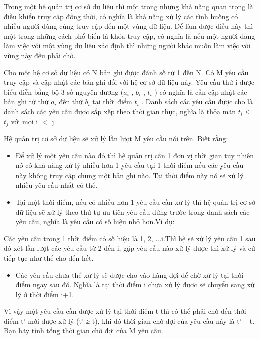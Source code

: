 Trong một hệ quản trị cơ sở dữ liệu thì một trong những khả năng quan trọng là điều khiển truy cập đồng thời, có nghĩa là khả năng xử lý các tình huống có nhiều người dùng cùng truy cập đến một vùng dữ liệu. Để làm được điều này thì một trong những cách phổ biến là khóa truy cập, có nghĩa là nếu một người đang làm việc với một vùng dữ liệu xác định thì những người khác muốn làm việc với vùng này đều phải chờ.

Cho một hệ cơ sở dữ liệu có N bản ghi được đánh số từ 1 đến N. Có M yêu cầu truy cập và cập nhật các bản ghi đối với hệ cơ sở dữ liệu này. Yêu cầu thứ i được biểu diễn bằng bộ 3 số nguyên dương ($a_{i}$ , $b_{i}$ , $t_{i}$ ) có nghĩa là cần cập nhật các bản ghi từ thứ $a_{i}$ đến thứ $b_{i}$ tại thời điểm $t_{i}$ . Danh sách các yêu cầu được cho là danh sách các yêu cầu được sắp xếp theo thời gian thực, nghĩa là thỏa mãn $t_{i}$ ≤ $t_{j}$ với mọi i $<$ j.

Hệ quản trị cơ sở dữ liệu sẽ xử lý lần lượt M yêu cầu nói trên. Biết rằng:
\begin{itemize}
	\item Để xử lý một yêu cầu nào đó thì hệ quản trị cần 1 đơn vị thời gian tuy nhiên nó có khả năng xử lý nhiều hơn 1 yêu cầu tại 1 thời điểm nếu các yêu cầu này không truy cập chung một bản ghi nào. Tại thời điểm này nó sẽ xử lý nhiều yêu cầu nhất có thể.
	\item Tại một thời điểm, nếu có nhiều hơn 1 yêu cầu cần xử lý thì hệ quản trị cơ sở dữ liệu sẽ xử lý theo thứ tự ưu tiên yêu cầu đứng trước trong danh sách các yêu cầu, nghĩa là yêu cầu có số hiệu nhỏ hơn.Ví dụ:
\end{itemize}

Các yêu cầu trong 1 thời điểm có số hiệu là 1, 2, ...i.Thì hệ sẽ xử lý yêu cầu 1 sau đó xét lần lượt các yêu cầu từ 2 đến i, gặp yêu cầu nào xử lý được thì xử lý và cứ tiếp tục như thế cho đến hết.
\begin{itemize}
	\item Các yêu cầu chưa thể xử lý sẽ được cho vào hàng đợi để chờ xử lý tại thời điểm ngay sau đó. Nghĩa là tại thời điểm i chưa xử lý được sẽ chuyển sang xử lý ở thời điểm i+1.
\end{itemize}

Vì vậy một yêu cầu cần được xử lý tại thời điểm t thì có thể phải chờ đến thời điểm t’ mới được xử lý (t’ ≥ t), khi đó thời gian chờ đợi của yêu cầu này là t’ – t. Bạn hãy tính tổng thời gian chờ đợi của M yêu cầu.
